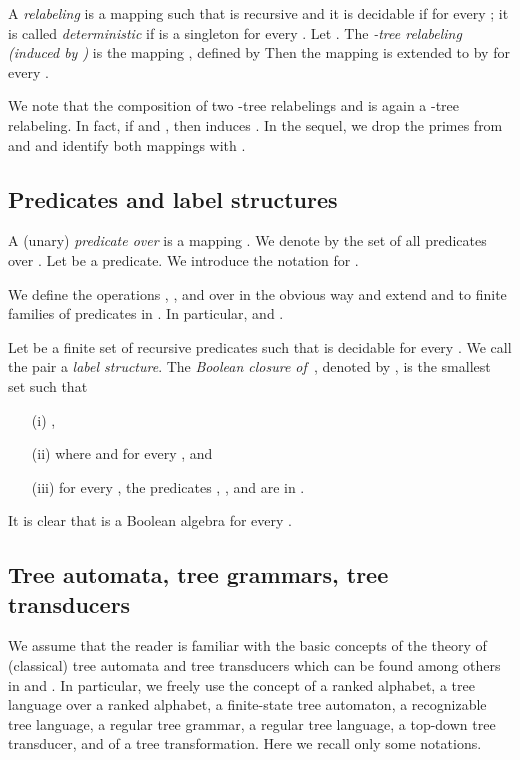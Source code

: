 \documentclass[10pt]{scrartcl}
\begin{document}
A \emph{relabeling} is a mapping 
such that  is recursive and it is decidable if  for every ; it
is called \emph{deterministic} if  is a singleton for every
. Let . The \emph{-tree relabeling (induced by
  )} is the mapping , defined by 
Then the mapping  is extended to 
by  for every . 

We note that the composition of two -tree relabelings  and
  is again a -tree relabeling. In fact, if 
and , then 
induces . 
In the sequel, we drop the primes from  and  and
identify both mappings with . 

\subsection{Predicates and label structures}

 A (unary) \emph{predicate
  over } is a mapping . We denote
by  the set of all predicates over . 
Let  be a predicate. We introduce the notation  for . 


We define the operations
, , and  over  in the obvious way and extend  and 
to finite families  of predicates in .  In particular,
 and .

Let  be a finite set of  recursive predicates such that
 is decidable for every .
We call the pair  a \emph{label structure}.
 The \emph{Boolean closure of~}, denoted
by , is the smallest set  such that 
\begin{enumerate}
\item[(i)] ,
\item[(ii)]  where  and  for
  every ,  and
\item[(iii)] for every , the predicates ,
  , and  are in .
\end{enumerate}
It is clear that
 is a Boolean algebra for every .
 






\subsection{Tree automata, tree grammars, tree transducers}

We assume that the reader is familiar with the basic concepts of the theory of (classical) tree automata and tree transducers which can be found among others in \cite{gecste84,gecste97} and \cite{comdaugiljaclugtistom97}. In particular, we freely use the concept of a ranked alphabet, a tree language over a ranked alphabet, a finite-state tree automaton, a recognizable tree language, a regular tree grammar, a regular tree language, a top-down tree transducer, and of a tree transformation. Here we recall only some notations.
\end{document}

